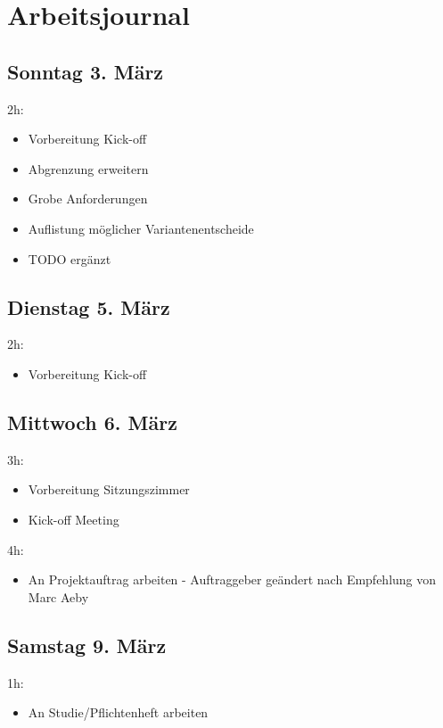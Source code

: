 \chapter{Arbeitsjournal}

\label{AppendixArbeitsjournal}

\section{Sonntag 3. März}\label{sonntag-3.-muxe4rz}

2h:

\begin{itemize}
\tightlist
\item
  Vorbereitung Kick-off
\item
  Abgrenzung erweitern
\item
  Grobe Anforderungen
\item
  Auflistung möglicher Variantenentscheide
\item
  TODO ergänzt
\end{itemize}

\section{Dienstag 5. März}\label{dienstag-5.muxe4rz}

2h:

\begin{itemize}
\tightlist
\item
  Vorbereitung Kick-off
\end{itemize}

\section{Mittwoch 6. März}\label{mittwoch-6.muxe4rz}

3h:

\begin{itemize}
\tightlist
\item
  Vorbereitung Sitzungszimmer
\item
  Kick-off Meeting
\end{itemize}

4h:

\begin{itemize}
\tightlist
\item
  An Projektauftrag arbeiten - Auftraggeber geändert nach Empfehlung
  von Marc Aeby
\end{itemize}

\section{Samstag 9. März}\label{samstag-9.muxe4rz}

1h:

\begin{itemize}
\tightlist
\item
  An Studie/Pflichtenheft arbeiten
\end{itemize}
